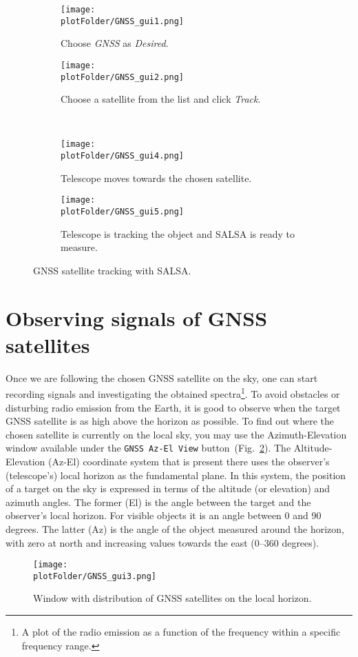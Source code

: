 \begin{figure}[ht] 
\centering
    \begin{subfigure}[a]{0.49\textwidth}
        \centering
        \texttt{[image: \\plotFolder/GNSS\_gui1.png]}
        \caption{Choose \emph{GNSS} as \emph{Desired}.}
    \end{subfigure}%
    \begin{subfigure}[b]{0.49\textwidth}
        \centering
        \texttt{[image: \\plotFolder/GNSS\_gui2.png]}
        \caption{Choose a satellite from the list and click \emph{Track}.}
    \end{subfigure} \\
        \begin{subfigure}[a]{0.49\textwidth}
        \centering
        \texttt{[image: \\plotFolder/GNSS\_gui4.png]}
        \caption{Telescope moves towards the chosen satellite.}
    \end{subfigure}%
    \begin{subfigure}[b]{0.49\textwidth}
        \centering
        \texttt{[image: \\plotFolder/GNSS\_gui5.png]}
        \caption{Telescope is tracking the object and SALSA is ready to measure.}
    \end{subfigure} 
  \caption{GNSS satellite tracking with SALSA.}    
\label{MainLab:GNSStracking}            

\end{figure} 

\section{Observing signals of GNSS satellites}
Once we are following the chosen GNSS satellite on the sky, one can start recording signals 
and investigating the obtained spectra\footnote{A plot of the radio emission as a function
of the frequency within a specific frequency range.}. To avoid obstacles or disturbing radio emission from the Earth, 
it is good to observe when the target GNSS satellite is as high above the horizon as possible. To find out
where the chosen satellite is currently on the local sky, you may use the Azimuth-Elevation window
available under the \verb!GNSS Az-El View! button~(Fig.~\ref{MainLab:AzElWindow}). The Altitude-Elevation (Az-El)
        coordinate system that is present there uses the observer's (telescope's) local horizon as the fundamental plane. In this system, the position of a target on the 
        sky is expressed in terms of the altitude (or elevation) and azimuth angles. The former (El) is the angle between the target and the observer's 
        local horizon. For visible objects it is an angle between 0 and 90 degrees. The latter (Az) is the angle of the object measured 
        around the horizon, with zero at north and increasing values towards the east (0--360 degrees).\par{}
\begin{figure}[t!] 
\centering
        \texttt{[image: \\plotFolder/GNSS\_gui3.png]}
        \caption{Window with distribution of GNSS satellites on the local horizon. }
\label{MainLab:AzElWindow}            
\end{figure} 

